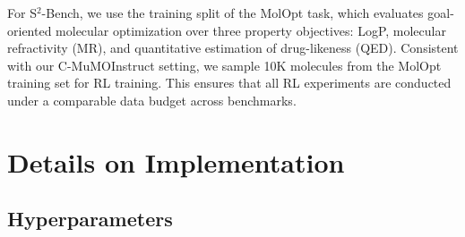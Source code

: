 \documentclass[11pt]{article}
\begin{document}
For S$^2$-Bench, we use the training split of the MolOpt task, which evaluates goal-oriented molecular optimization over three property objectives: LogP, molecular refractivity (MR), and quantitative estimation of drug-likeness (QED). Consistent with our C-MuMOInstruct setting, we sample 10K molecules from the MolOpt training set for RL training. This ensures that all RL experiments are conducted under a comparable data budget across benchmarks.


\section{Details on Implementation}
\label{appendix:implementation}
\subsection{Hyperparameters}
\label{appendix:hyperparams}

\begin{table}[!htbp]
\centering
\small
\caption{Hyperparameters for Mistral and Llama RL post-training stages.}
\label{tab:llm-hyperparams}
\end{table}
\end{document}
